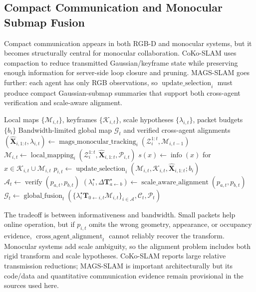 \documentclass[11pt, a4paper, logo]{googledeepmind}
\begin{document}
\subsection{Compact Communication and Monocular Submap Fusion}

Compact communication appears in both RGB-D and monocular systems, but it becomes structurally central for monocular collaboration. CoKo-SLAM uses compaction to reduce transmitted Gaussian/keyframe state while preserving enough information for server-side loop closure and pruning. MAGS-SLAM goes further: each agent has only RGB observations, so $\operatorname{update\_selection}_i$ must produce compact Gaussian-submap summaries that support both cross-agent verification and scale-aware alignment.

\begin{algorithm}[H]
\caption{Compact communication and monocular submap fusion pattern}
\label{alg:taxonomy-compact-monocular}
\small
\begin{algorithmic}[1]
  \Require Local maps $\{\mathcal{M}_{i,t}\}$, keyframes $\{\mathcal{K}_{i,t}\}$, scale hypotheses $\{\lambda_{i,t}\}$, packet budgets $\{b_i\}$
  \Ensure Bandwidth-limited global map $\mathcal{G}_t$ and verified cross-agent alignments
  \State $(\hat{\mathbf{X}}_{i,1:t},\lambda_{i,t}) \gets \operatorname{mags\_monocular\_tracking}_i(\mathcal{Z}_i^{1:t},\mathcal{M}_{i,t-1})$ 
  \State $\mathcal{M}_{i,t} \gets \operatorname{local\_mapping}_i(\mathcal{Z}_i^{1:t},\hat{\mathbf{X}}_{i,1:t},\mathcal{P}_{i,t})$ 
  \State $s(x) \gets \operatorname{info}(x)$ for $x\in\mathcal{K}_{i,t}\cup\mathcal{M}_{i,t}$ 
  \State $p_{i,t} \gets \operatorname{update\_selection}_i(\mathcal{M}_{i,t},\mathcal{K}_{i,t},\hat{\mathbf{X}}_{i,1:t};b_i)$ 
  \State $\mathcal{A}_t \gets \operatorname{verify}(p_{a,t},p_{b,t})$ 
  \State $(\lambda_i^\star,\Delta\mathbf{T}_{a\leftarrow b}^\star) \gets \operatorname{scale\_aware\_alignment}(p_{a,t},p_{b,t})$ 
  \State $\mathcal{G}_t \gets \operatorname{global\_fusion}_t(\{\lambda_i^\star\mathbf{T}_{0\leftarrow i,t}\mathcal{M}_{i,t}\}_{i\in\mathcal{A}},\mathcal{C}_t,\mathcal{P}_t)$ 
\end{algorithmic}
\end{algorithm}

The tradeoff is between informativeness and bandwidth. Small packets help online operation, but if $p_{i,t}$ omits the wrong geometry, appearance, or occupancy evidence, $\operatorname{cross\_agent\_alignment}_t$ cannot reliably recover the transform. Monocular systems add scale ambiguity, so the alignment problem includes both rigid transform and scale hypotheses. CoKo-SLAM reports large relative transmission reductions; MAGS-SLAM is important architecturally but its code/data and quantitative communication evidence remain provisional in the sources used here.
\end{document}
